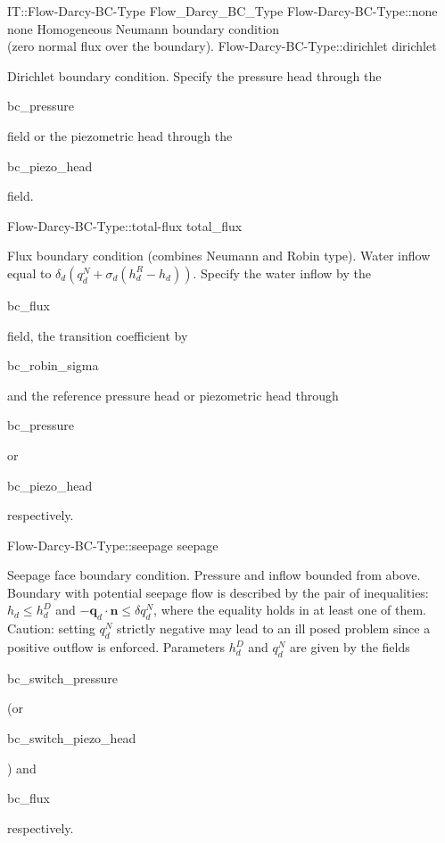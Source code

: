 \begin{SelectionType}
	{IT::Flow-Darcy-BC-Type}
	{Flow{\_}Darcy{\_}BC{\_}Type}
	{}
		\SelectionItem
			{Flow-Darcy-BC-Type::none}
			{none}
			{{{Homogeneous Neumann boundary condition}\\{
(zero normal flux over the boundary).}%
}}
		\SelectionItem
			{Flow-Darcy-BC-Type::dirichlet}
			{dirichlet}
			{{{Dirichlet boundary condition.
Specify the pressure head through the }\begin{ttfamily}bc{\_}pressure\end{ttfamily}{ field or the piezometric head through the }\begin{ttfamily}bc{\_}piezo{\_}head\end{ttfamily}{ field.}%
}}
		\SelectionItem
			{Flow-Darcy-BC-Type::total-flux}
			{total{\_}flux}
			{{{Flux boundary condition (combines Neumann and Robin type). Water inflow equal to }{$ \delta_d(q_d^N + \sigma_d (h_d^R - h_d) )$}{. Specify the water inflow by the }\begin{ttfamily}bc{\_}flux\end{ttfamily}{ field, the transition coefficient by }\begin{ttfamily}bc{\_}robin{\_}sigma\end{ttfamily}{ and the reference pressure head or piezometric head through }\begin{ttfamily}bc{\_}pressure\end{ttfamily}{ or }\begin{ttfamily}bc{\_}piezo{\_}head\end{ttfamily}{ respectively.}%
}}
		\SelectionItem
			{Flow-Darcy-BC-Type::seepage}
			{seepage}
			{{{Seepage face boundary condition.
Pressure and inflow bounded from above.
Boundary with potential seepage flow is described by the pair of inequalities: }{$h_d \le h_d^D$}{ and }{$ -\boldsymbol q_d\cdot\boldsymbol n \le \delta q_d^N$}{, where the equality holds in at least one of them.
Caution: setting }{$q_d^N$}{ strictly negative may lead to an ill posed problem since a positive outflow is enforced.
Parameters }{$h_d^D$}{ and }{$q_d^N$}{ are given by the fields }\begin{ttfamily}bc{\_}switch{\_}pressure\end{ttfamily}{ (or }\begin{ttfamily}bc{\_}switch{\_}piezo{\_}head\end{ttfamily}{) and }\begin{ttfamily}bc{\_}flux\end{ttfamily}{ respectively.}%
}}
\end{SelectionType}
